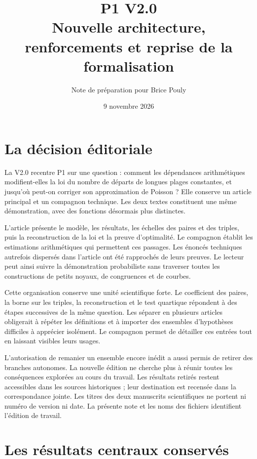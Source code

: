 \documentclass[11pt,a4paper]{article}
\title{\bfseries P1 V2.0\\[5pt]\large Nouvelle architecture, renforcements et reprise de la formalisation}
\author{Note de préparation pour Brice Pouly}
\date{9 novembre 2026}
\begin{document}
\maketitle
\thispagestyle{plain}

\section{La décision éditoriale}

La V2.0 recentre P1 sur une question : comment les dépendances arithmétiques modifient-elles la loi du nombre de départs de longues plages constantes, et jusqu'où peut-on corriger son approximation de Poisson ? Elle conserve un article principal et un compagnon technique. Les deux textes constituent une même démonstration, avec des fonctions désormais plus distinctes.

L'article présente le modèle, les résultats, les échelles des paires et des triples, puis la reconstruction de la loi et la preuve d'optimalité. Le compagnon établit les estimations arithmétiques qui permettent ces passages. Les énoncés techniques autrefois dispersés dans l'article ont été rapprochés de leurs preuves. Le lecteur peut ainsi suivre la démonstration probabiliste sans traverser toutes les constructions de petits noyaux, de congruences et de courbes.

Cette organisation conserve une unité scientifique forte. Le coefficient des paires, la borne sur les triples, la reconstruction et le test quartique répondent à des étapes successives de la même question. Les séparer en plusieurs articles obligerait à répéter les définitions et à importer des ensembles d'hypothèses difficiles à apprécier isolément. Le compagnon permet de détailler ces entrées tout en laissant visibles leurs usages.

L'autorisation de remanier un ensemble encore inédit a aussi permis de retirer des branches autonomes. La nouvelle édition ne cherche plus à réunir toutes les conséquences explorées au cours du travail. Les résultats retirés restent accessibles dans les sources historiques ; leur destination est recensée dans la correspondance jointe. Les titres des deux manuscrits scientifiques ne portent ni numéro de version ni date. La présente note et les noms des fichiers identifient l'édition de travail.

\section{Les résultats centraux conservés}
\end{document}
